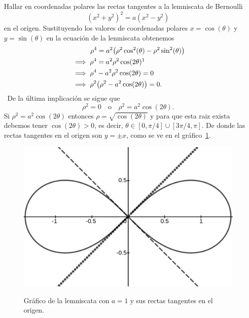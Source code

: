 \documentclass[mid,fleqn,draft,twoside]{notasdeclase}
\begin{document}
\begin{ejem}
	Hallar en coordenadas polares las rectas tangentes a la lemniscata de Bernoulli
	\[( x^2+y^2)^2 = a(x^2-y^2) \]
	en el origen.
	Sustituyendo los valores de coordenadas polares $x=\cos(\theta)$ y $y=\sin(\theta)$ en la ecuación de la lenmiscata obtenemos
	\begin{align*}
		&\phantom{\implies}\hspace{.6em} \rho^4 = a^2\big(\rho^2\cos^2(\theta) - \rho^2\sin^2(\theta)\big) \\
		&\implies \rho^4 = a^2\rho^2\cos(2\theta)\footnotemark \\
		&\implies \rho^4 - a^2\rho^2\cos(2\theta) = 0 \\
		&\implies \rho^2 \big(\rho^2 - a^2\cos(2\theta)\big) = 0.
	\end{align*}
	\
	De la última implicación se sigue que
	\[ \rho^2 = 0 \quad\text{o}\quad \rho^2 = a^2\cos(2\theta). \]
	Si $\rho^2 = a^2\cos(2\theta)$ entonces $\rho=\sqrt{\cos(2\theta)}$ y para que esta raiz exista debemos tener $\cos(2\theta)>0$, es decir, $\theta\in[0,\pi/4]\cup[3\pi/4,\pi]$. De donde las rectas tangentes en el origen son $y=\pm x$, como se ve en el gráfico~\ref{ch0g6}.
		\begin{center}
			\begin{minipage}{.5\linewidth}
		\begin{figure}[H]\centering
			\includegraphics[width=1\linewidth]{pics/l1}\\ 
			\caption{Gráfico de la lemniscata con $a=1$ y sus rectas tangentes en el origen.}\label{ch0g6}
		\end{figure}
	\end{minipage}
		\end{center}
\end{ejem}
\end{document}
